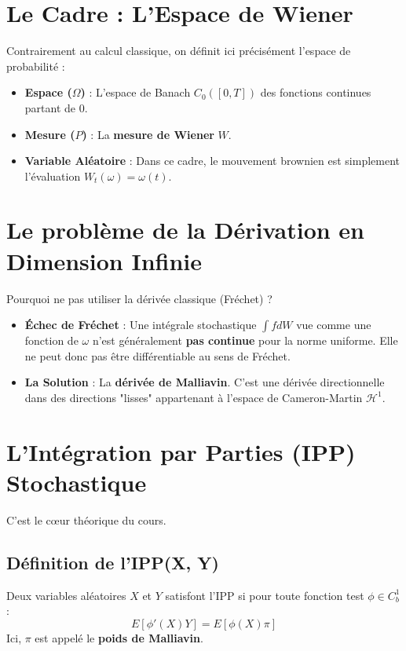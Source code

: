 \documentclass{article}
\begin{document}
\section{Le Cadre : L'Espace de Wiener}
Contrairement au calcul classique, on définit ici précisément l'espace de probabilité :
\begin{itemize}
    \item \textbf{Espace ($\Omega$)} : L'espace de Banach $C_0([0,T])$ des fonctions continues partant de 0.
    \item \textbf{Mesure ($P$)} : La \textbf{mesure de Wiener} $W$.
    \item \textbf{Variable Aléatoire} : Dans ce cadre, le mouvement brownien est simplement l'évaluation $W_t(\omega) = \omega(t)$.
\end{itemize}

\section{Le problème de la Dérivation en Dimension Infinie}
Pourquoi ne pas utiliser la dérivée classique (Fréchet) ?
\begin{itemize}
    \item \textbf{Échec de Fréchet} : Une intégrale stochastique $\int f dW$ vue comme une fonction de $\omega$ n'est généralement \textbf{pas continue} pour la norme uniforme. Elle ne peut donc pas être différentiable au sens de Fréchet.
    \item \textbf{La Solution} : La \textbf{dérivée de Malliavin}. C'est une dérivée directionnelle dans des directions "lisses" appartenant à l'espace de Cameron-Martin $\mathcal{H}^1$.
\end{itemize}

\section{L'Intégration par Parties (IPP) Stochastique}
C'est le cœur théorique du cours.

\subsection{Définition de l'IPP(X, Y)}
Deux variables aléatoires $X$ et $Y$ satisfont l'IPP si pour toute fonction test $\phi \in C_b^1$ :
\[
E[\phi'(X) Y] = E[\phi(X) \pi]
\]
Ici, $\pi$ est appelé le \textbf{poids de Malliavin}.
\end{document}
